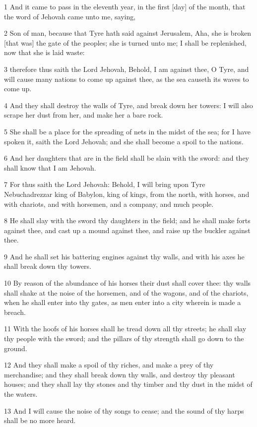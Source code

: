 \par 1 And it came to pass in the eleventh year, in the first [day] of the month, that the word of Jehovah came unto me, saying,
\par 2 Son of man, because that Tyre hath said against Jerusalem, Aha, she is broken [that was] the gate of the peoples; she is turned unto me; I shall be replenished, now that she is laid waste:
\par 3 therefore thus saith the Lord Jehovah, Behold, I am against thee, O Tyre, and will cause many nations to come up against thee, as the sea causeth its waves to come up.
\par 4 And they shall destroy the walls of Tyre, and break down her towers: I will also scrape her dust from her, and make her a bare rock.
\par 5 She shall be a place for the spreading of nets in the midst of the sea; for I have spoken it, saith the Lord Jehovah; and she shall become a spoil to the nations.
\par 6 And her daughters that are in the field shall be slain with the sword: and they shall know that I am Jehovah.
\par 7 For thus saith the Lord Jehovah: Behold, I will bring upon Tyre Nebuchadrezzar king of Babylon, king of kings, from the north, with horses, and with chariots, and with horsemen, and a company, and much people.
\par 8 He shall slay with the sword thy daughters in the field; and he shall make forts against thee, and cast up a mound against thee, and raise up the buckler against thee.
\par 9 And he shall set his battering engines against thy walls, and with his axes he shall break down thy towers.
\par 10 By reason of the abundance of his horses their dust shall cover thee: thy walls shall shake at the noise of the horsemen, and of the wagons, and of the chariots, when he shall enter into thy gates, as men enter into a city wherein is made a breach.
\par 11 With the hoofs of his horses shall he tread down all thy streets; he shall slay thy people with the sword; and the pillars of thy strength shall go down to the ground.
\par 12 And they shall make a spoil of thy riches, and make a prey of thy merchandise; and they shall break down thy walls, and destroy thy pleasant houses; and they shall lay thy stones and thy timber and thy dust in the midst of the waters.
\par 13 And I will cause the noise of thy songs to cease; and the sound of thy harps shall be no more heard.
